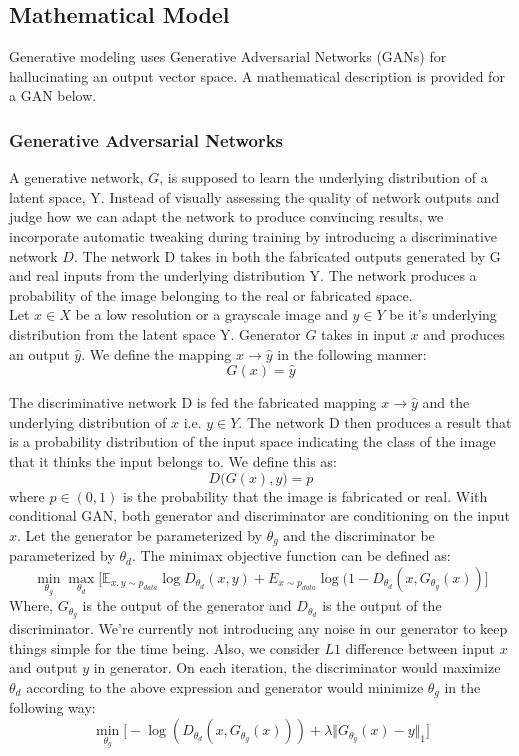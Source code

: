 \documentclass{article} %
\begin{document}
    \subsection{Mathematical Model}
    Generative modeling uses Generative Adversarial Networks (GANs) for hallucinating an output vector space. A mathematical description is provided for a GAN below.
    \subsubsection{Generative Adversarial Networks}
\hspace*{0.167 in}A generative network, $G$, is supposed to learn the underlying distribution of a latent space, Y. Instead of visually assessing the quality of network outputs and judge how we can adapt the network to produce convincing results, we incorporate automatic tweaking during training by introducing a discriminative network $D$. The network D takes in both the fabricated outputs generated by G and real inputs from the underlying distribution Y. The network produces a probability of the image belonging to the real or fabricated space.\\
\hspace*{0.167 in}Let $x \in X$ be a low resolution or a grayscale image and $y \in Y$ be it's underlying distribution from the latent space Y. Generator $G$ takes in input $x$ and produces an output $\hat{y}$. We define the mapping $x \rightarrow \hat{y}$ in the following manner:
      $$G(x) = \hat{y}$$
    
\hspace*{0.167 in}The discriminative network D is fed the fabricated mapping $x \rightarrow \hat{y}$ and the underlying distribution of $x$ i.e. $y \in Y$. The network D then produces a result that is a probability distribution of the input space indicating the class of the image that it thinks the input belongs to. We define this as:
     $$D\big(G(x),y\big) = p$$
     where $p \in (0,1)$ is the probability that the image is fabricated or real.
\hspace*{0.167 in}With conditional GAN, both generator and discriminator are conditioning on the input $x$. Let the generator be parameterized by $\theta_g$ and the discriminator be parameterized by $\theta_d$. The minimax objective function can be defined as:
    	\begingroup\makeatletter\def\f@size{7}\check@mathfonts \[
    		\min_{\theta_g}\max_{\theta_d}\Big[\mathbb{E}_{x,y\sim p_{data}} \log D_{\theta_d}(x,y) + E_{x\sim p_{data}} \log(1 - D_{\theta_d}(x, G_{\theta_g}(x))\Big]
    	\] \endgroup
        \normalsize
    Where, $G_{\theta_{g}}$ is the output of the generator and $D_{\theta_d}$ is the output of the discriminator.
    We're currently not introducing any noise in our generator to keep things simple for the time being. Also, we consider $L1$ difference between input $x$ and output $y$ in generator. On each iteration, the discriminator would maximize $\theta_d$ according to the above expression and generator would minimize $\theta_g$ in the following way:
    	\[
    		\min_{\theta_g}\Big[-\log(D_{\theta_d}(x,G_{\theta_g}(x)))+\lambda \Vert G_{\theta_g}(x) - y \Vert_1 \Big]
    	\]
    
\end{document}
